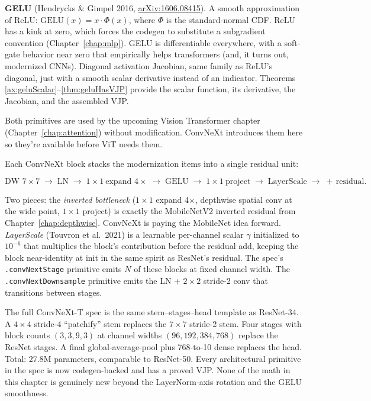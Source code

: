 \textbf{GELU} (Hendrycks \& Gimpel 2016,
\href{https://arxiv.org/abs/1606.08415}{arXiv:1606.08415}). A smooth
approximation of ReLU: \(\mathrm{GELU}(x) = x \cdot \Phi(x)\), where
\(\Phi\) is the standard-normal CDF. ReLU has a kink at zero, which
forces the codegen to substitute a subgradient convention
(Chapter~\ref{chap:mlp}). GELU is differentiable everywhere, with a
soft-gate behavior near zero that empirically helps transformers
(and, it turns out, modernized CNNs). Diagonal activation Jacobian,
same family as ReLU's diagonal, just with a smooth scalar derivative
instead of an indicator. Theorems
\ref{ax:geluScalar}--\ref{thm:geluHasVJP} provide the scalar
function, its derivative, the Jacobian, and the assembled VJP.

Both primitives are used by the upcoming Vision Transformer chapter
(Chapter~\ref{chap:attention}) without modification. ConvNeXt
introduces them here so they're available before ViT needs them.


Each ConvNeXt block stacks the modernization items into a single
residual unit:

\[
\text{DW } 7 \times 7 \;\to\; \text{LN} \;\to\;
1 \times 1\ \text{expand } 4\times \;\to\; \text{GELU} \;\to\;
1 \times 1\ \text{project} \;\to\; \text{LayerScale} \;\to\; +\,\text{residual}.
\]

Two pieces: the \emph{inverted bottleneck}
($1 \times 1$ expand 4$\times$, depthwise spatial conv at the wide
point, $1 \times 1$ project) is exactly the MobileNetV2 inverted
residual from Chapter~\ref{chap:depthwise}. ConvNeXt is paying the
MobileNet idea forward. \emph{LayerScale} (Touvron et al.\ 2021) is
a learnable per-channel scalar \(\gamma\) initialized to \(10^{-6}\)
that multiplies the block's contribution before the residual add,
keeping the block near-identity at init in the same spirit as
ResNet's residual. The spec's \texttt{.convNextStage} primitive
emits \(N\) of these blocks at fixed channel width. The
\texttt{.convNextDownsample} primitive emits the LN + $2 \times 2$
stride-2 conv that transitions between stages.


The full ConvNeXt-T spec is the same stem--stages--head template
as ResNet-34. A $4 \times 4$ stride-4 ``patchify'' stem replaces
the $7 \times 7$ stride-2 stem. Four stages with block counts
\((3, 3, 9, 3)\) at channel widths \((96, 192, 384, 768)\) replace
the ResNet stages. A final global-average-pool plus 768-to-10
dense replaces the head. Total: 27.8M parameters, comparable to
ResNet-50. Every architectural primitive in the spec is now
codegen-backed and has a proved VJP. None of the math in this
chapter is genuinely new beyond the LayerNorm-axis rotation and
the GELU smoothness.

